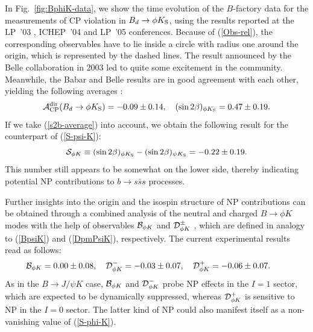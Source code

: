 \documentclass[11pt]{cernrep}
\begin{document}
In Fig.~\ref{fig:BphiK-data}, we show the time evolution of the $B$-factory data
for the measurements of CP violation in $B_d\to\phi K_{\rm S}$, using the results 
reported at the LP~'03 \cite{LP03}, ICHEP~'04 \cite{ICHEP04} and LP~'05 \cite{LP05}
conferences. Because of (\ref{Obs-rel}), the corresponding observables have
to lie inside a circle with radius one around the origin, which is represented by the
dashed lines. The result announced by the Belle collaboration in
2003 led to quite some excitement in the community. Meanwhile, the Babar
\cite{BaBar-Bphi-K} and Belle \cite{Belle-Bphi-K} results are in good agreement 
with each other, yielding the following averages \cite{HFAG}:
\begin{equation}\label{BphiK-av}
{\cal A}_{\rm CP}^{\rm dir}(B_d\to \phi K_{\rm S})=-0.09\pm0.14, \quad
(\sin2\beta)_{\phi K_{\rm S}}=0.47\pm0.19. 
\end{equation}
If  we take (\ref{s2b-average}) into account, we obtain the following result for
the counterpart of (\ref{S-psi-K}):
\begin{equation}\label{S-phi-K}
{\cal S}_{\phi K}\equiv (\sin 2\beta)_{\phi K_{\rm S}}- (\sin 2\beta)_{\psi K_{\rm S}}
=-0.22\pm0.19.
\end{equation}
This number still appears to be somewhat on the lower side, thereby indicating potential 
NP contributions to $b\to s \bar s s$ processes.

Further insights into the origin and the isospin structure of NP contributions 
can be obtained through a combined analysis of the neutral and charged 
$B\to \phi K$ modes with the help of observables 
${\cal B}_{\phi K}$ and ${\cal D}^\pm_{\phi K}$ \cite{FM-BphiK}, which are 
defined in analogy to (\ref{BpsiK}) and (\ref{DpmPsiK}), respectively. The
current experimental results read as follows:
\begin{equation}\label{B-Dpm-PhiK-res}
\hspace*{-0.7truecm} {\cal B}_{\phi K} =0.00\pm0.08,\quad
{\cal D}^-_{\phi K}=-0.03\pm0.07, \quad
{\cal D}^+_{\phi K}=-0.06\pm0.07.
\end{equation}
As in the $B\to J/\psi K$ case, ${\cal B}_{\phi K}$ and ${\cal D}^-_{\phi K}$ probe
NP effects in the $I=1$ sector, which are expected to be dynamically suppressed,
whereas ${\cal D}^+_{\phi K}$ is sensitive to NP in the $I=0$ sector. The latter 
kind of NP could also manifest itself as a non-vanishing value of (\ref{S-phi-K}).
\end{document}
